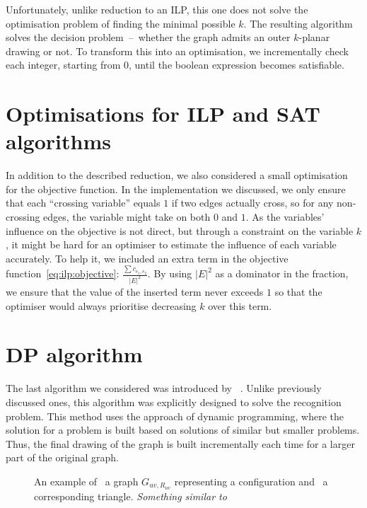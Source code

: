 Unfortunately, unlike reduction to an ILP, this one does not solve the optimisation problem of finding the minimal possible \(k\). The resulting algorithm solves the decision problem~--~whether the graph admits an outer \(k\)-planar drawing or not. To transform this into an optimisation, we incrementally check each integer, starting from \(0\), until the boolean expression becomes satisfiable.


\section{Optimisations for ILP and SAT algorithms}\label{sec:optimisations}


In addition to the described reduction, we also considered a small optimisation for the objective function. In the implementation we discussed, we only ensure that each ``crossing variable'' equals \(1\) if two edges actually cross, so for any non-crossing edges, the variable might take on both \(0\) and \(1\). As the variables' influence on the objective is not direct, but through a constraint on the variable \(k\), it might be hard for an optimiser to estimate the influence of each variable accurately. To help it, we included an extra term in the objective function~\eqref{eq:ilp:objective}: \(\frac{\sum c_{e_1, e_2}}{|E|^2}\). By using \(|E|^2\) as a dominator in the fraction, we ensure that the value of the inserted term never exceeds \(1\) so that the optimiser would always prioritise decreasing \(k\) over this term.


\section{DP algorithm}

The last algorithm we considered was introduced by \citeauthor{okp}~\cite{okp}. Unlike previously discussed ones, this algorithm was explicitly designed to solve the recognition problem. This method uses the approach of dynamic programming, where the solution for a problem is built based on solutions of similar but smaller problems. Thus, the final drawing of the graph is built incrementally each time for a larger part of the original graph.

\begin{figure}
    \centering
    \captionsetup{subrefformat=parens}
    \hfill
    \caption{
        An example of \protect{}~a graph \(G_{uv, R_{uv}}\) representing a configuration and \protect{}~a corresponding triangle.
        \emph{Something similar to\cite[Figure 4]{okp}}
    }
\end{figure}


